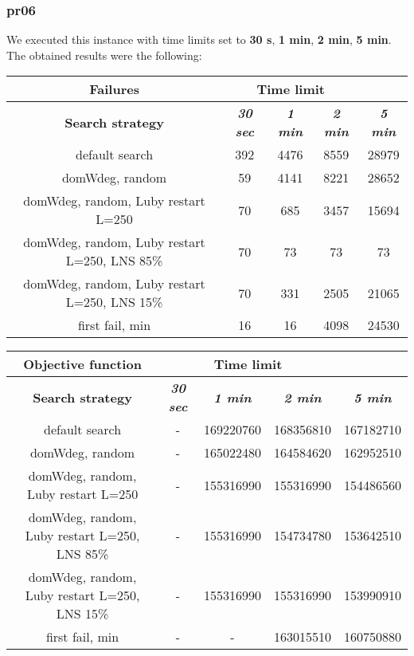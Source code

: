 \subsubsection{pr06}
We executed this instance with time limits set to \textbf{30 s}, \textbf{1 min}, \textbf{2 min}, \textbf{5 min}.\\
The obtained results were the following:
{
\renewcommand{\arraystretch}{2}
\begin{longtable}[h]{| c | c | c | c | c |}
    \hline
    \textbf{Failures} & \multicolumn{3}{c}{Time limit} & \\
    \hline
    \textbf{Search strategy} & \textbf{\textit{30 sec}} & \textbf{\textit{1 min}} & \textbf{\textit{2 min}} & \textbf{\textit{5 min}} \\
    \hline
    \endhead
    default search                                & 392 & 4476 & 8559 & 28979 \\
    \hline
    domWdeg, random                               &  59 & 4141 & 8221 & 28652 \\
    \hline
    domWdeg, random, Luby restart L=250           &  70 &  685 & 3457 & 15694 \\
    \hline
    domWdeg, random, Luby restart L=250, LNS 85\% &  70 &   73 &   73 &    73 \\
    \hline
    domWdeg, random, Luby restart L=250, LNS 15\% &  70 &  331 & 2505 &  21065 \\
    \hline
    first fail, min                               &  16 &   16 & 4098 &  24530 \\
    \hline
\end{longtable}
}

{
\renewcommand{\arraystretch}{2}
\begin{longtable}[h]{| c | c | c | c | c |}
    \hline
    \textbf{Objective function} & \multicolumn{3}{c}{Time limit} & \\
    \hline
    \textbf{Search strategy} & \textbf{\textit{30 sec}} & \textbf{\textit{1 min}} & \textbf{\textit{2 min}} & \textbf{\textit{5 min}} \\
    \hline
    \endhead
    default search                                & - & 169220760 & 168356810 & 167182710 \\
    \hline
    domWdeg, random                               & - & 165022480 & 164584620 & 162952510 \\
    \hline
    domWdeg, random, Luby restart L=250           & - & 155316990 & 155316990 & 154486560 \\
    \hline
    domWdeg, random, Luby restart L=250, LNS 85\% & - & 155316990 & 154734780 & 153642510 \\
    \hline
    domWdeg, random, Luby restart L=250, LNS 15\% & - & 155316990 & 155316990 & 153990910 \\
    \hline
    first fail, min                               & - &         - & 163015510 & 160750880 \\
    \hline
\end{longtable}
}